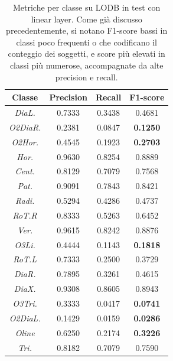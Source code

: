 \begin{table}[p]
    \centering
    \setlength{\tabcolsep}{5pt} %
    \renewcommand{\arraystretch}{1.6} %
    \begin{tabular}{c|c|c|c}
         Classe & \textbf{Precision} & \textbf{Recall} & \textbf{F1-score} \\
         \hline
         \hline
\textit{DiaL.}               &       0.7333   &    0.3438   &    0.4681       \\
\textit{O2DiaR.}             &      0.2381    &   0.0847    &   \textbf{0.1250}       \\
\textit{O2Hor.}              &       0.4545   &    0.1923   &    \textbf{0.2703}       \\
\textit{Hor.}                &       0.9630   &    0.8254   &    0.8889       \\
\textit{Cent.}               &       0.8129   &    0.7079   &    0.7568       \\
\textit{Pat.}                &       0.9091   &    0.7843   &    0.8421       \\
\textit{Radi.}               &       0.5294   &    0.4286   &    0.4737       \\
\textit{RoT.R}               &       0.8333   &    0.5263   &    0.6452       \\
\textit{Ver.}                &       0.9615   &    0.8242   &    0.8876       \\
\textit{O3Li.}               &       0.4444   &    0.1143   &    \textbf{0.1818}       \\
\textit{RoT.L}               &       0.7333   &    0.2500   &    0.3729       \\
\textit{DiaR.}               &       0.7895   &    0.3261   &    0.4615       \\
\textit{DiaX.}               &       0.9308   &    0.8605   &    0.8943       \\
\textit{O3Tri.}              &       0.3333   &    0.0417   &    \textbf{0.0741}       \\
\textit{O2DiaL.}             &       0.1429   &    0.0159   &    \textbf{0.0286}       \\
\textit{Oline}               &      0.6250    &   0.2174    &   \textbf{0.3226}       \\
\textit{Tri.}                &      0.8182    &   0.7079    &   0.7590       \\
    \end{tabular}
    \caption{Metriche per classe su LODB in test con linear layer. Come già discusso precedentemente, si notano F1-score bassi in classi poco frequenti o che codificano il conteggio dei soggetti, e score più elevati in classi più numerose, accompagnate da alte precision e recall. }
    \label{tab:lodb_metriche_classe}
\end{table}

